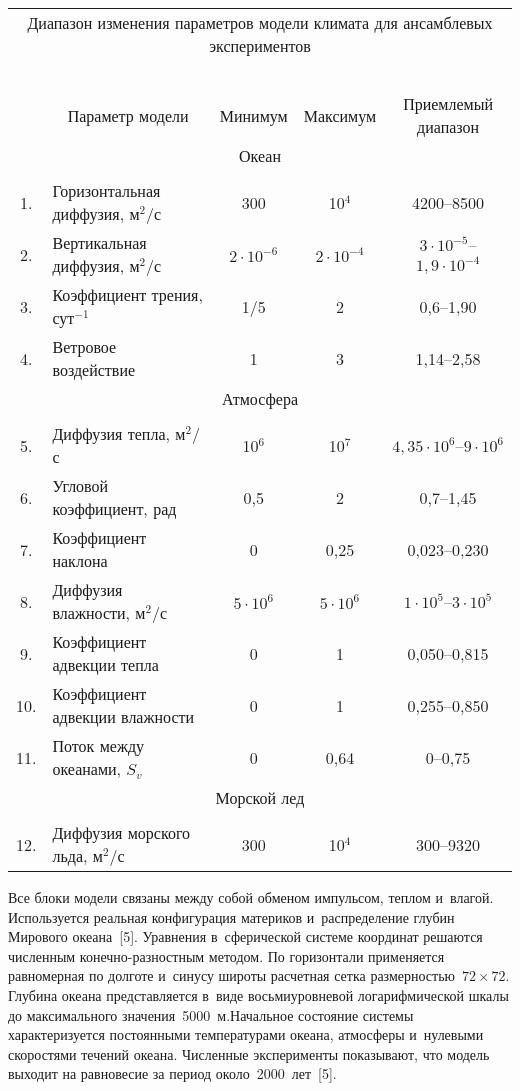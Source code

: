 \begin{multicols}{2}
\begin{table*}[b]
\begin{center}
\begin{tabular}{|c|l|c|c|c|}
\multicolumn{5}{c}{Диапазон изменения параметров модели климата для ансамблевых 
экспериментов}\\
\multicolumn{5}{c}{\ }\\[-6pt]
\hline
&\multicolumn{1}{c|}{Параметр модели}&Минимум&Максимум&Приемлемый 
диапазон\\
\hline
\multicolumn{5}{|c|}{Океан}\\
\hline
&&&&\\[-9pt]
1.& Горизонтальная диффузия, м$^2$/с & 300 & 10$^4$ & 4200--8500\\
2. & Вертикальная диффузия, м$^2$/с & $2\cdot 10^{-6}$ & $2\cdot 10^{-4}$ &  
$3\cdot 10^{-5}$--$1{,}9\cdot 10^{-4}$\\
3. & Коэффициент трения, сут$^{-1}$ & 1/5 & 2 & 0,6--1,90\\
4. & Ветровое воздействие & 1& 3& 1,14--2,58\\
\hline
\multicolumn{5}{|c|}{Атмосфера}\\
\hline
&&&&\\[-9pt]
5. & Диффузия тепла, м$^2$/с & 10$^6$ & 10$^7$ & $4{,}35\cdot 10^6$--$9\cdot 10^6$\\
6. & Угловой коэффициент, рад & 0,5& 2& 0,7--1,45\\
7. & Коэффициент наклона & 0& 0,25& 0,023--0,230\\
8. & Диффузия влажности, м$^2$/с & $5\cdot 10^6$ & $5\cdot 10^6$ & $1\cdot 10^5$--$3\cdot 10^5$\\
9. & Коэффициент адвекции тепла & 0 & 1& 0,050--0,815\\
10.\hphantom{9} & Коэффициент адвекции влажности & 0 &1& 0,255--0,850\\
11.\hphantom{9} & Поток между океанами, $S_v$ & 0 & 0,64& 0--0,75\\
\hline
\multicolumn{5}{|c|}{Морской лед}\\
\hline
&&&&\\[-9pt]
12.\hphantom{9} &Диффузия морского льда, м$^2$/с & 300& 10$^4$ & 300--9320\\
\hline
\end{tabular}
\end{center}
\end{table*}
  
  Все блоки модели связаны между собой обменом импульсом, теплом 
и~влагой. Используется реальная конфигурация материков и~распределение 
глубин Мирового океана~[5]. Уравнения в~сферической системе координат 
решаются численным ко\-неч\-но-раз\-ност\-ным методом. По горизонтали 
применяется равномерная по долготе и~синусу широты расчетная сетка 
размерностью~$72\times72$. Глубина океана представляется в~виде 
восьмиуровневой логарифмической шкалы до максимального 
значения~5000~м.\linebreak Начальное состояние системы характеризуется постоянными 
температурами океана, атмосферы и~нулевыми скоростями течений океана. 
Численные эксперименты показывают, что модель выходит на равновесие за 
период около~2000~лет~[5].


\end{multicols}
